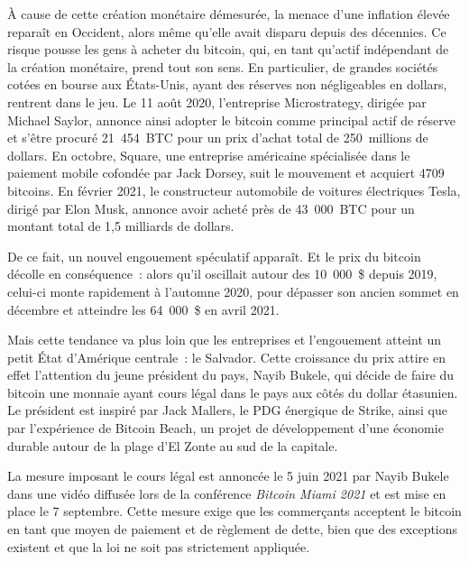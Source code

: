 À cause de cette création monétaire démesurée, la menace d'une inflation élevée reparaît en Occident, alors même qu'elle avait disparu depuis des décennies. Ce risque pousse les gens à acheter du bitcoin, qui, en tant qu'actif indépendant de la création monétaire, prend tout son sens. En particulier, de grandes sociétés cotées en bourse aux États-Unis, ayant des réserves non négligeables en dollars, rentrent dans le jeu. Le 11 août 2020, l'entreprise Microstrategy, dirigée par Michael Saylor, annonce ainsi adopter le bitcoin comme principal actif de réserve et s'être procuré 21~454~BTC pour un prix d'achat total de 250~millions de dollars. En octobre, Square, une entreprise américaine spécialisée dans le paiement mobile cofondée par Jack Dorsey, suit le mouvement et acquiert 4709 bitcoins. En février 2021, le constructeur automobile de voitures électriques Tesla, dirigé par Elon Musk, annonce avoir acheté près de 43~000~BTC pour un montant total de 1,5 milliards de dollars.

De ce fait, un nouvel engouement spéculatif apparaît. Et le prix du bitcoin décolle en conséquence~: alors qu'il oscillait autour des 10~000~\$ depuis 2019, celui-ci monte rapidement à l'automne 2020, pour dépasser son ancien sommet en décembre et atteindre les 64~000~\$ en avril 2021.

Mais cette tendance va plus loin que les entreprises et l'engouement atteint un petit État d'Amérique centrale~: le Salvador. Cette croissance du prix attire en effet l'attention du jeune président du pays, Nayib Bukele, qui décide de faire du bitcoin une monnaie ayant cours légal dans le pays aux côtés du dollar étasunien. Le président est inspiré par Jack Mallers, le PDG énergique de Strike, ainsi que par l'expérience de Bitcoin Beach, un projet de développement d'une économie durable autour de la plage d'El Zonte au sud de la capitale.

La mesure imposant le cours légal est annoncée le 5 juin 2021 par Nayib Bukele dans une vidéo diffusée lors de la conférence \emph{Bitcoin Miami 2021} et est mise en place le 7 septembre. Cette mesure exige que les commerçants acceptent le bitcoin en tant que moyen de paiement et de règlement de dette, bien que des exceptions existent et que la loi ne soit pas strictement appliquée.

